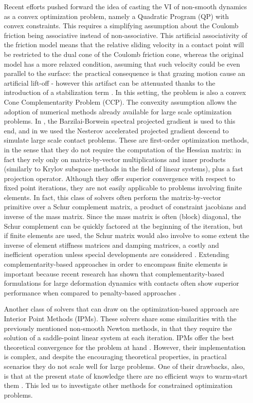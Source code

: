 \documentclass[AMA,STIX1COL]{WileyNJD-v2}
\begin{document}
Recent efforts pushed forward the idea of casting the VI of non-smooth dynamics as a convex optimization problem, namely a Quadratic Program (QP) with convex constraints. This requires a simplifying assumption about the Coulomb friction being associative instead of non-associative. This artificial associativity of the friction model means that the relative sliding velocity in a contact point will be restricted to the dual cone of the Coulomb friction cone, whereas the original model has a more relaxed condition, assuming that such velocity could be even parallel to the surface: the practical consequence is that grazing motion cause an artificial lift-off - however this artifact can be attenuated thanks to the introduction of a stabilization term \cite{ani04}. In this setting, the problem is also a convex Cone Complementarity Problem (CCP). The convexity assumption allows the adoption of numerical methods already available for large scale optimization problems. In \cite{heynIJNME2013}, the Barzilai-Borwein spectral projected gradient is used to this end, and in \cite{hammadTOG2015} we used the Nesterov accelerated projected gradient descend to simulate large scale contact problems.
These are first-order optimization methods, in the sense that they do not require the computation of the Hessian matrix: in fact they rely only on  matrix-by-vector multiplications and inner products (similarly to Krylov subspace methods in the field of linear systems), plus a fast projection operator. Although they offer superior convergence with respect to fixed point iterations, they are not easily applicable to problems involving finite elements. In fact, this class of solvers often perform the matrix-by-vector primitive over a Schur complement matrix, a product of constraint jacobians and inverse of the mass matrix. Since the mass matrix is often (block) diagonal, the Schur complement can be quickly factored at the beginning of the iteration, but if finite elements are used, the Schur matrix would also involve to some extent the inverse of element stiffness matrices and damping matrices, a costly and inefficient operation unless special developments are considered \cite{Francu2017}.
Extending complementarity-based approaches in order to encompass finite elements is important because recent research has shown that complementarity-based formulations for large deformation dynamics with contacts often show superior performance when compared to penalty-based approaches \cite{Yu2020,Bozorgmehri2021}.

Another class of solvers that can draw on the optimization-based approach are Interior Point Methods (IPMs). These solvers share some similarities with the previously mentioned non-smooth Newton methods, in that they require the solution of a saddle-point linear system at each iteration. IPMs offer the best theoretical convergence for the problem at hand \cite{Potra2000}. However, their implementation is complex, and despite the encouraging theoretical properties, in practical scenarios they do not scale well for large problems. One of their drawbacks, also, is that at the present state of knowledge there are no efficient ways to warm-start them \cite{Mangoni2018}. This led us to investigate other methods for constrained optimization problems.
\end{document}
